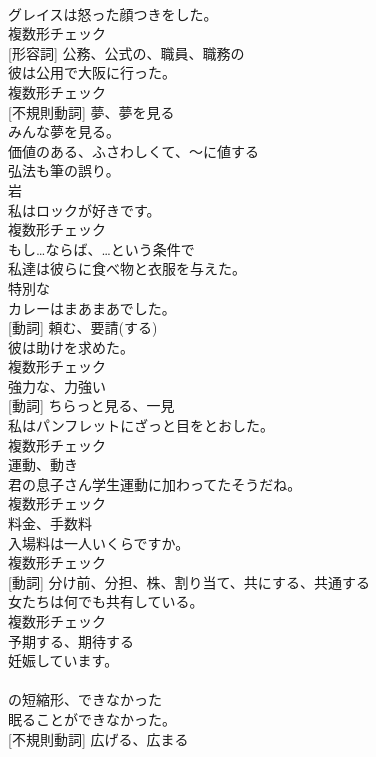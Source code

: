 \documentclass[8pt]{extreport}
\begin{document}
\begin{CJK}{UTF8}{min}
\\	グレイスは怒った顔つきをした。	
\\	複数形チェック
\\	[名詞] [形容詞]	公務、公式の、職員、職務の	
\\	彼は公用で大阪に行った。	
\\	複数形チェック
\\	[動詞] [不規則動詞]	夢、夢を見る	
\\	みんな夢を見る。	
\\	[形容詞]	価値のある、ふさわしくて、～に値する	
\\	弘法も筆の誤り。	
\\	[名詞]	岩	
\\	私はロックが好きです。	
\\	複数形チェック
\\	[接続詞]	もし…ならば、…という条件で	
\\	私達は彼らに食べ物と衣服を与えた。	
\\	[形容詞]	特別な	
\\	カレーはまあまあでした。	
\\	[名詞] [動詞]	頼む、要請(する)	
\\	彼は助けを求めた。	
\\	複数形チェック
\\	[形容詞]	強力な、力強い	
\\	[名詞] [動詞]	ちらっと見る、一見	
\\	私はパンフレットにざっと目をとおした。	
\\	複数形チェック
\\	[名詞]	運動、動き	
\\	君の息子さん学生運動に加わってたそうだね。	
\\	複数形チェック
\\	[名詞]	料金、手数料	
\\	入場料は一人いくらですか。	
\\	複数形チェック
\\	[名詞] [動詞]	分け前、分担、株、割り当て、共にする、共通する	
\\	女たちは何でも共有している。	
\\	複数形チェック
\\	[動詞]	予期する、期待する	
\\	妊娠しています。	
\\	[短縮形]	
\\	の短縮形、できなかった	
\\	眠ることができなかった。	
\\	[動詞] [不規則動詞]	広げる、広まる	

\end{CJK}
\end{document}

